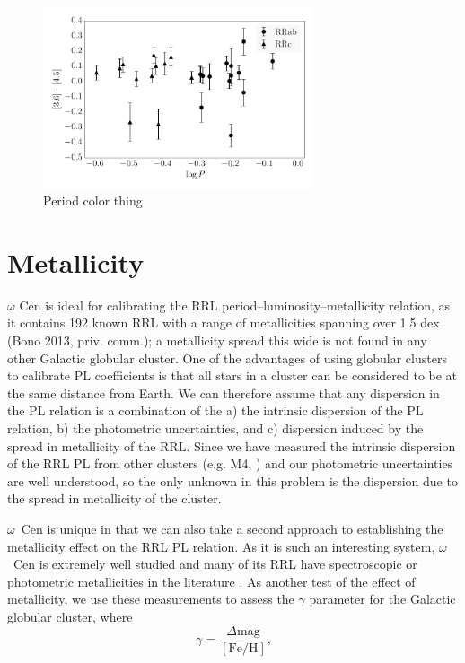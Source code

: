 \documentclass[a4paper,fleqn,usenatbib]{mnras}
\begin{document}
\begin{figure}
\begin{center}
\includegraphics[width=80mm]{reworked_fitting_code/final_plots/period_color_clipped.pdf}
\caption{Period color thing} %
\label{fig:period_color}
\end{center}
\end{figure}

\section{Metallicity}
\label{sec:metallicity}

$\omega$ Cen is ideal for calibrating the RRL period--luminosity--metallicity relation, as it contains 192 known RRL \citep{2004A&A...424.1101K} with a range of metallicities spanning over 1.5 dex (Bono 2013, priv. comm.); a metallicity spread this wide is not found in any other Galactic globular cluster. One of the advantages of using globular clusters to calibrate PL coefficients is that all stars in a cluster can be considered to be at the same distance from Earth. We can therefore assume that any dispersion in the PL relation is a combination of the a) the intrinsic dispersion of the PL relation, b) the photometric uncertainties, and c) dispersion induced by the spread in metallicity of the RRL. Since we have measured the intrinsic dispersion of the RRL PL from other clusters (e.g. M4, \citet{2015arXiv150507858N}) and our photometric uncertainties are well understood, so the only unknown in this problem is the dispersion due to the spread in metallicity of the cluster. 

 $\omega$~Cen is unique in that we can also take a second approach to establishing the metallicity effect on the RRL PL relation. As it is such an interesting system, $\omega$~Cen is extremely well studied and many of its RRL have spectroscopic or photometric metallicities in the literature \citep[e.g.][]{2006ApJ...640L..43S, 2000AJ....119.1824R}. As another test of the effect of metallicity, we use these measurements to assess the $\gamma$ parameter for the Galactic globular cluster, where 
\begin{equation} \label{eqn:gamma}
\gamma = \dfrac {\Delta \text{mag}} {[\text{Fe/H}]}\text{,}
\end{equation}
\end{document}
